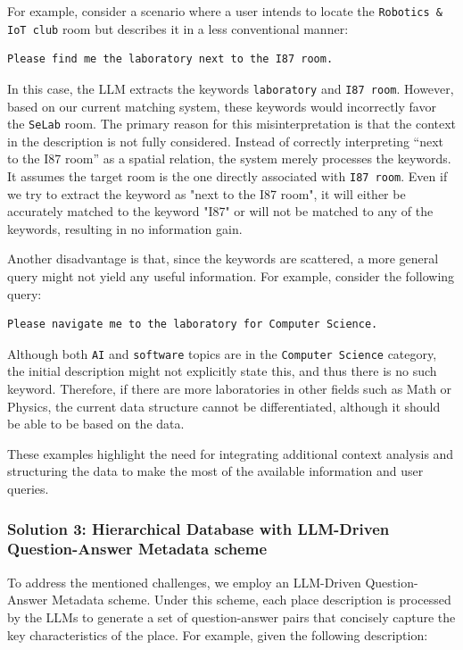 For example, consider a scenario where a user intends to locate the \texttt{Robotics \& IoT club} room but describes it in a less conventional manner:

\begin{lstlisting}[style=cSharp]
Please find me the laboratory next to the I87 room.
\end{lstlisting}

In this case, the LLM extracts the keywords \texttt{laboratory} and \texttt{I87 room}. However, based on our current matching system, these keywords would incorrectly favor the \texttt{SeLab} room. The primary reason for this misinterpretation is that the context in the description is not fully considered. Instead of correctly interpreting “next to the I87 room” as a spatial relation, the system merely processes the keywords. It assumes the target room is the one directly associated with \texttt{I87 room}. Even if we try to extract the keyword as "next to the I87 room", it will either be accurately matched to the keyword "I87" or will not be matched to any of the keywords, resulting in no information gain. \label{no-information-gain}

Another disadvantage is that, since the keywords are scattered, a more general query might not yield any useful information. For example, consider the following query:

\begin{lstlisting}[style=cSharp]
Please navigate me to the laboratory for Computer Science.
\end{lstlisting}

Although both \texttt{AI} and \texttt{software} topics are in the \texttt{Computer Science} category, the initial description might not explicitly state this, and thus there is no such keyword. Therefore, if there are more laboratories in other fields such as Math or Physics, the current data structure cannot be differentiated, although it should be able to be based on the data.\label{not-generalized}

These examples highlight the need for integrating additional context analysis and structuring the data to make the most of the available information and user queries.

\subsubsection{Solution 3: Hierarchical Database with LLM-Driven Question-Answer Metadata scheme}

\label{subsubsub:QA-pairs}
To address the mentioned challenges, we employ an LLM-Driven Question-Answer Metadata scheme. Under this scheme, each place description is processed by the LLMs to generate a set of question-answer pairs that concisely capture the key characteristics of the place. For example, given the following description:

